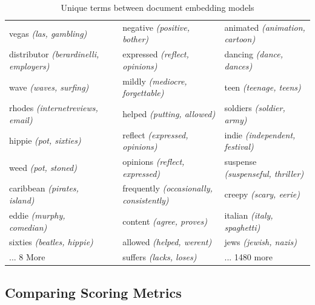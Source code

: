 {\begin{landscape}
\begin{table}[]
\begin{tabular}{llll}
			vegas \textit{(las, gambling)}                 &                          & negative \textit{(positive, bother)}             & animated \textit{(animation, cartoon)}           \\
			distributor \textit{(berardinelli, employers)} &                          & expressed \textit{(reflect, opinions)}           & dancing \textit{(dance, dances)}                 \\
			wave \textit{(waves, surfing)}                 &                          & mildly \textit{(mediocre, forgettable)}          & teen \textit{(teenage, teens)}                   \\
			rhodes \textit{(internetreviews, email)}       &                          & helped \textit{(putting, allowed)}               & soldiers \textit{(soldier, army)}                \\
			hippie \textit{(pot, sixties)}                 &                          & reflect \textit{(expressed, opinions)}           & indie \textit{(independent, festival)}           \\
			weed \textit{(pot, stoned)}                    &                          & opinions \textit{(reflect, expressed)}           & suspense \textit{(suspenseful, thriller)}        \\
			caribbean \textit{(pirates, island)}           &                          & frequently \textit{(occasionally, consistently)} & creepy \textit{(scary, eerie)}                   \\
			eddie \textit{(murphy, comedian)}              &                          & content \textit{(agree, proves)}                 & italian \textit{(italy, spaghetti)}              \\
			sixties \textit{(beatles, hippie)}             &                          & allowed \textit{(helped, werent)}                & jews \textit{(jewish, nazis)}                    \\
			... 8 More                   		  &                          & suffers \textit{(lacks, loses)}                  & ... 1480 more               
		\end{tabular}
		\caption{Unique terms between document embedding models}\label{ch3:ComparingSpaceTypes}
	\end{table}
\end{landscape}
}

\subsection{Comparing Scoring Metrics}

